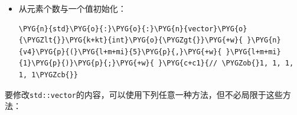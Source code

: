 \begin{itemize}
\begin{codeblockbg}
\begin{Verbatim}[commandchars=\\\{\},breaklines=true,breakanywhere=true,fontsize=\codefont,xleftmargin=17bp]
\PYG{n}{std}\PYG{o}{:}\PYG{o}{:}\PYG{n}{list}\PYG{o}{\PYGZlt{}}\PYG{k+kt}{int}\PYG{o}{\PYGZgt{}}\PYG{+w}{ }\PYG{n}{l}\PYG{p}{\PYGZob{}}\PYG{+w}{ }\PYG{l+m+mi}{1}\PYG{p}{,}\PYG{+w}{ }\PYG{l+m+mi}{2}\PYG{p}{,}\PYG{+w}{ }\PYG{l+m+mi}{3}\PYG{p}{,}\PYG{+w}{ }\PYG{l+m+mi}{4}\PYG{p}{,}\PYG{+w}{ }\PYG{l+m+mi}{5}\PYG{+w}{ }\PYG{p}{\PYGZcb{}}\PYG{p}{;}
\PYG{n}{std}\PYG{o}{:}\PYG{o}{:}\PYG{n}{vector}\PYG{o}{\PYGZlt{}}\PYG{k+kt}{int}\PYG{o}{\PYGZgt{}}\PYG{+w}{ }\PYG{n}{v3}\PYG{p}{(}\PYG{n}{l}\PYG{p}{.}\PYG{n}{begin}\PYG{p}{(}\PYG{p}{)}\PYG{p}{,}\PYG{+w}{ }\PYG{n}{l}\PYG{p}{.}\PYG{n}{end}\PYG{p}{(}\PYG{p}{)}\PYG{p}{)}\PYG{p}{;}\PYG{+w}{ }\PYG{c+c1}{//\PYGZob{} 1, 2, 3, 4, 5 \PYGZcb{}}
\end{Verbatim}
\end{codeblockbg}



\item 从元素个数与一个值初始化：



\begin{codeblockbg}
\begin{Verbatim}[commandchars=\\\{\},breaklines=true,breakanywhere=true,fontsize=\codefont,xleftmargin=17bp]
\PYG{n}{std}\PYG{o}{:}\PYG{o}{:}\PYG{n}{vector}\PYG{o}{\PYGZlt{}}\PYG{k+kt}{int}\PYG{o}{\PYGZgt{}}\PYG{+w}{ }\PYG{n}{v4}\PYG{p}{(}\PYG{l+m+mi}{5}\PYG{p}{,}\PYG{+w}{ }\PYG{l+m+mi}{1}\PYG{p}{)}\PYG{p}{;}\PYG{+w}{ }\PYG{c+c1}{// \PYGZob{}1, 1, 1, 1, 1\PYGZcb{}}
\end{Verbatim}
\end{codeblockbg}

\end{itemize}



要修改\texttt{std::\allowbreak{}vector}的内容，可以使用下列任意一种方法，但不必局限于这些方法：



